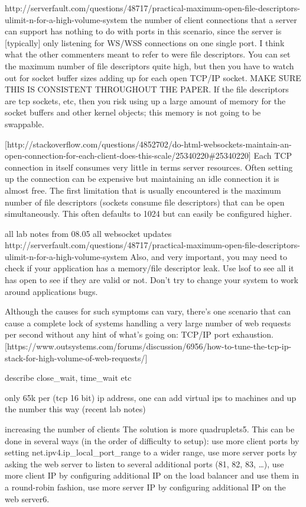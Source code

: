 \documentclass{uvamscse}
\begin{document}
http://serverfault.com/questions/48717/practical-maximum-open-file-descriptors-ulimit-n-for-a-high-volume-system
the number of client connections that a server can support has nothing to do with ports in this scenario, since the server is [typically] only listening for WS/WSS connections on one single port. I think what the other commenters meant to refer to were file descriptors. You can set the maximum number of file descriptors quite high, but then you have to watch out for socket buffer sizes adding up for each open TCP/IP socket.  MAKE SURE THIS IS CONSISTENT THROUGHOUT THE PAPER.
If the file descriptors are tcp sockets, etc, then you risk using up a large amount of memory for the socket buffers and other kernel objects; this memory is not going to be swappable.

[http://stackoverflow.com/questions/4852702/do-html-websockets-maintain-an-open-connection-for-each-client-does-this-scale/25340220\#25340220]
Each TCP connection in itself consumes very little in terms server resources. Often setting up the connection can be expensive but maintaining an idle connection it is almost free. The first limitation that is usually encountered is the maximum number of file descriptors (sockets consume file descriptors) that can be open simultaneously. This often defaults to 1024 but can easily be configured higher.

all lab notes from 08.05
all websocket updates
http://serverfault.com/questions/48717/practical-maximum-open-file-descriptors-ulimit-n-for-a-high-volume-system
Also, and very important, you may need to check if your application has a memory/file descriptor leak. Use lsof to see all it has open to see if they are valid or not. Don't try to change your system to work around applications bugs.

Although the causes for such symptoms can vary, there's one scenario that can cause a complete lock of systems handling a very large number of web requests per second without any hint of what's going on: TCP/IP port exhaustion. [https://www.outsystems.com/forums/discussion/6956/how-to-tune-the-tcp-ip-stack-for-high-volume-of-web-requests/]

describe close\_wait, time\_wait etc

only 65k per (tcp 16 bit) ip address, one can add virtual ips to machines and up the number this way
(recent lab notes)

increasing the number of clients
The solution is more quadruplets5. This can be done in several ways (in the order of difficulty to setup):
use more client ports by setting net.ipv4.ip\_local\_port\_range to a wider range,
use more server ports by asking the web server to listen to several additional ports (81, 82, 83, …),
use more client IP by configuring additional IP on the load balancer and use them in a round-robin fashion,
use more server IP by configuring additional IP on the web server6.
\end{document}
